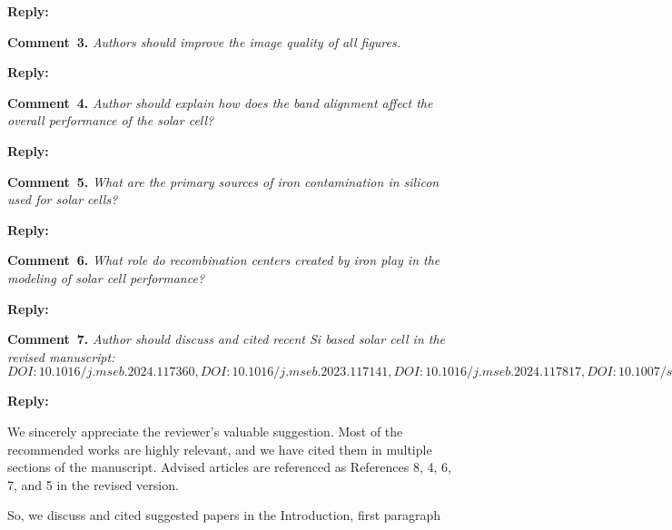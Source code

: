 \documentclass[a4paper,fleqn]{cas-sc}
\begin{document}
\noindent
\textcolor[rgb]{0.51,0.00,0.00}{\textbf{Reply:}}




\noindent
\textcolor[rgb]{0.00,0.50,1.00}{\textbf{Comment~3.}}
\emph{Authors should improve the image quality of all figures.}

\noindent
\textcolor[rgb]{0.51,0.00,0.00}{\textbf{Reply:}}




\noindent
\textcolor[rgb]{0.00,0.50,1.00}{\textbf{Comment~4.}}
\emph{Author should explain how does the band alignment affect the overall performance of the solar cell?}

\noindent
\textcolor[rgb]{0.51,0.00,0.00}{\textbf{Reply:}}




\noindent
\textcolor[rgb]{0.00,0.50,1.00}{\textbf{Comment~5.}}
\emph{What are the primary sources of iron contamination in silicon used for solar cells?}

\noindent
\textcolor[rgb]{0.51,0.00,0.00}{\textbf{Reply:}}




\noindent
\textcolor[rgb]{0.00,0.50,1.00}{\textbf{Comment~6.}}
\emph{What role do recombination centers created by iron play in the modeling of solar cell performance?}

\noindent
\textcolor[rgb]{0.51,0.00,0.00}{\textbf{Reply:}}




\noindent
\textcolor[rgb]{0.00,0.50,1.00}{\textbf{Comment~7.}}
\emph{Author should discuss and cited recent Si based solar cell in the revised manuscript:
$DOI:10.1016/j.mseb.2024.117360,
DOI:10.1016/j.mseb.2023.117141,
DOI:10.1016/j.mseb.2024.117817,
DOI:10.1007/s42247-024-00821-y,
DOI:10.1016/j.inoche.2024.112785$}

\noindent
\textcolor[rgb]{0.51,0.00,0.00}{\textbf{Reply:}}


We sincerely appreciate the reviewer’s valuable suggestion.
Most of the recommended works are highly relevant, and we have cited them in multiple sections of the manuscript.
Advised articles are referenced as References 8, 4, 6, 7, and 5 in the revised version.

So, we discuss and cited suggested papers in the Introduction, first paragraph
\end{document}
